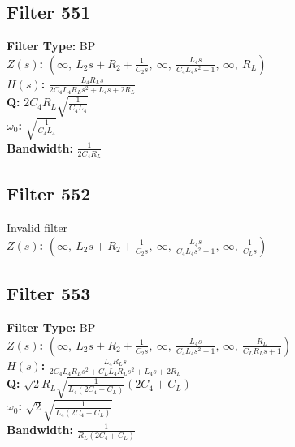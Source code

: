 \documentclass{article}
\begin{document}
\subsection*{Filter 551}
\textbf{Filter Type:} BP \\ 
\textbf{$Z(s)$:} $\left( \infty, \  L_{2} s + R_{2} + \frac{1}{C_{2} s}, \  \infty, \  \frac{L_{4} s}{C_{4} L_{4} s^{2} + 1}, \  \infty, \  R_{L}\right)$ \\ 
\textbf{$H(s)$:} $\frac{L_{4} R_{L} s}{2 C_{4} L_{4} R_{L} s^{2} + L_{4} s + 2 R_{L}}$ \\ 
\textbf{Q:} $2 C_{4} R_{L} \sqrt{\frac{1}{C_{4} L_{4}}}$ \\ 
\textbf{$\omega_0$:} $\sqrt{\frac{1}{C_{4} L_{4}}}$ \\ 
\textbf{Bandwidth:} $\frac{1}{2 C_{4} R_{L}}$ \\ 
\subsection*{Filter 552}
Invalid filter \\ 
\textbf{$Z(s)$:} $\left( \infty, \  L_{2} s + R_{2} + \frac{1}{C_{2} s}, \  \infty, \  \frac{L_{4} s}{C_{4} L_{4} s^{2} + 1}, \  \infty, \  \frac{1}{C_{L} s}\right)$ \\ 
\subsection*{Filter 553}
\textbf{Filter Type:} BP \\ 
\textbf{$Z(s)$:} $\left( \infty, \  L_{2} s + R_{2} + \frac{1}{C_{2} s}, \  \infty, \  \frac{L_{4} s}{C_{4} L_{4} s^{2} + 1}, \  \infty, \  \frac{R_{L}}{C_{L} R_{L} s + 1}\right)$ \\ 
\textbf{$H(s)$:} $\frac{L_{4} R_{L} s}{2 C_{4} L_{4} R_{L} s^{2} + C_{L} L_{4} R_{L} s^{2} + L_{4} s + 2 R_{L}}$ \\ 
\textbf{Q:} $\sqrt{2} R_{L} \sqrt{\frac{1}{L_{4} \left(2 C_{4} + C_{L}\right)}} \left(2 C_{4} + C_{L}\right)$ \\ 
\textbf{$\omega_0$:} $\sqrt{2} \sqrt{\frac{1}{L_{4} \left(2 C_{4} + C_{L}\right)}}$ \\ 
\textbf{Bandwidth:} $\frac{1}{R_{L} \left(2 C_{4} + C_{L}\right)}$ \\ 
\end{document}
